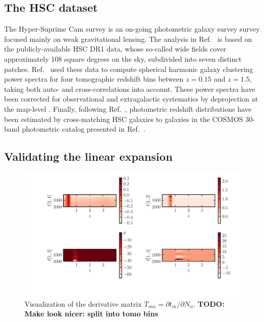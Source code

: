 \documentclass[a4paper,11pt]{article}
\newcommand{\todo}[1]{{\bf TODO: #1}}
\begin{document}
\subsection{The HSC dataset}
The Hyper-Suprime Cam survey is an on-going photometric galaxy survey survey focused mainly on weak gravitational lensing. The analysis in Ref.~\cite{1912.08209} is based on the publicly-available HSC DR1 data, whose so-called wide fields cover approximately 108 square degrees on the sky, subdivided into seven distinct patches. Ref.~\cite{1912.08209} used these data to compute spherical harmonic galaxy clustering power spectra for four tomographic redshift bins between $z=0.15$ and $z=1.5$, taking both auto- and cross-correlations into account. These power spectra have been corrected for observational and extragalactic systematics by deprojection at the map-level \cite{2019MNRAS.484.4127A}. Finally, following Ref.~\cite{2019PASJ...71...43H}, photometric redshift distributions have been estimated by cross-matching HSC galaxies to galaxies in the COSMOS 30-band photometric catalog presented in Ref.~\cite{2016ApJS..224...24L}.
\subsection{Validating the linear expansion}


\begin{figure}[ht]
\centering  
\includegraphics[width=1.2\textwidth]{./Tmat}
\caption{Visualization of the derivative matrix $T_{mn} = {\partial t_m}/{\partial N_n}$. \todo{Make look nicer: split into tomo bins}} 
\label{fig:Tmat}
\end{figure}
\end{document}
